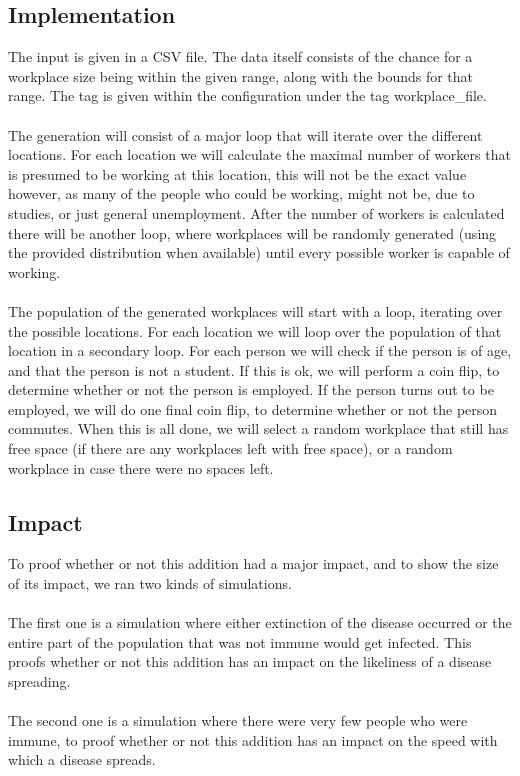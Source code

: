 \documentclass[runningheads]{llncs}
\begin{document}
	\subsection{Implementation}
	The input is given in a CSV file. The data itself consists of the chance for a workplace size being within the given range, along with the bounds for that range. The tag is given within the configuration under the tag workplace\_file. \\
	\\
	The generation will consist of a major loop that will iterate over the different locations. For each location we will calculate the maximal number of workers that is presumed to be working at this location, this will not be the exact value however, as many of the people who could be working, might not be, due to studies, or just general unemployment. After the number of workers is calculated there will be another loop, where workplaces will be randomly generated (using the provided distribution when available) until every possible worker is capable of working. \\
	\\
	The population of the generated workplaces will start with a loop, iterating over the possible locations. For each location we will loop over the population of that location in a secondary loop. For each person we will check if the person is of age, and that the person is not a student. If this is ok, we will perform a coin flip, to determine whether or not the person is employed. If the person turns out to be employed, we will do one final coin flip, to determine whether or not the person commutes. When this is all done, we will select a random workplace that still has free space (if there are any workplaces left with free space), or a random workplace in case there were no spaces left. 
	\subsection{Impact}
	To proof whether or not this addition had a major impact, and to show the size of its impact, we ran two kinds of simulations.\\
	\\
	The first one is a simulation where either extinction of the disease occurred or the entire part of the population that was not immune would get infected. This proofs whether or not this addition has an impact on the likeliness of a disease spreading.\\
	\\
	The second one is a simulation where there were very few people who were immune, to proof whether or not this addition has an impact on the speed with which a disease spreads.
\end{document}
